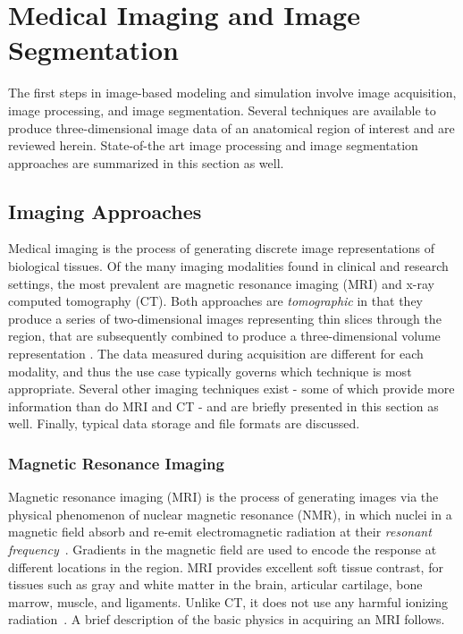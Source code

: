 \chapter{Medical Imaging and Image Segmentation}
%

The first steps in image-based modeling and simulation involve image acquisition, image processing, and image segmentation. Several techniques are available to produce three-dimensional image data of an anatomical region of interest and are reviewed herein. State-of-the art image processing and image segmentation approaches are summarized in this section as well.

\section{Imaging Approaches}
\label{Imaging Approaches}

Medical imaging is the process of generating discrete image representations of biological tissues. Of the many imaging modalities found in clinical and research settings, the most prevalent are magnetic resonance imaging (MRI) and x-ray computed tomography (CT). Both approaches are \textit{tomographic} in that they produce a series of two-dimensional images representing thin slices through the region, that are subsequently combined to produce a three-dimensional volume representation \cite{larobina_murino_2014}. The data measured during acquisition are different for each modality, and thus the use case typically governs which technique is most appropriate. Several other imaging techniques exist - some of which provide more information than do MRI and CT - and are briefly presented in this section as well. Finally, typical data storage and file formats are discussed.

\subsection{Magnetic Resonance Imaging}
\label{Magnetic Resonance Imaging}

Magnetic resonance imaging (MRI) is the process of generating images via the physical phenomenon of nuclear magnetic resonance (NMR), in which nuclei in a magnetic field absorb and re-emit electromagnetic radiation at their \textit{resonant frequency}~\cite{NMR}. Gradients in the magnetic field are used to encode the response at different locations in the region. MRI provides excellent soft tissue contrast, for tissues such as gray and white matter in the brain, articular cartilage, bone marrow, muscle, and ligaments. Unlike CT, it does not use any harmful ionizing radiation~\cite{waldman_campbell}. A brief description of the basic physics in acquiring an MRI follows.

